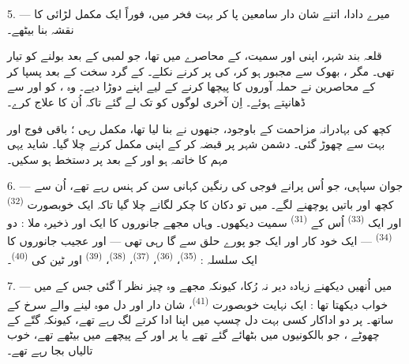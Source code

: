 5. --- میرے دادا، اتنے شان دار سامعین پا کر بہت فخر میں، فوراً ایک
مکمل لڑائی کا نقشہ بنا بیٹھے۔

قلعہ بند شہر، اپنی  اور  سمیت،
 کے محاصرے میں تھا، جو لمبی  کے
بعد  بولنے کو تیار تھی۔ مگر ، بھوک سے
مجبور ہو کر،  کی  پر
 کرنے نکلے۔  کے گرد سخت 
کے بعد  پسپا کر کے  محاصرین نے
 حملہ آوروں کا پیچھا کرنے کے لیے اپنے
 دوڑا دیے۔ وہ ، 
کو  اور  سے ڈھانپتے ہوئے۔
 اِن آخری لوگوں کو  تک لے گئے
تاکہ  اُن کا علاج کرے۔

کچھ  کی بہادرانہ مزاحمت کے باوجود، جنھوں نے
 بنا لیا تھا،  مکمل رہی ؛ باقی فوج
 اور بہت سے  چھوڑ گئی۔ دشمن شہر پر قبضہ
کر کے اپنی  مکمل کرنے چلا گیا۔ شاید یہی مہم کا خاتمہ ہو
اور  کے بعد  پر دستخط ہو سکیں۔

\VUsaut{4.4mm}
\VUsaut{2.8mm}

6. --- جوان سپاہی، جو اُس پرانے فوجی کی رنگین کہانی سن کر ہنس رہے
تھے، اُن سے کچھ اور باتیں پوچھنے لگے۔ میں تو دکان کا چکر لگانے چلا
گیا تاکہ ایک خوبصورت  \textsuperscript{(32)} اور
ایک  \textsuperscript{(33)} اُس کے 
\textsuperscript{(31)} سمیت دیکھوں۔ وہاں مجھے جانوروں کا ایک اور
ذخیرہ ملا : دو  \textsuperscript{(34)} — ایک
خود کار  اور ایک  جو پورے حلق سے گا رہی
تھی — اور عجیب جانوروں کا ایک سلسلہ : 
\textsuperscript{(35)}،  \textsuperscript{(36)}،
 \textsuperscript{(37)}، 
\textsuperscript{(38)}،  \textsuperscript{(39)} اور ٹین کی
 \textsuperscript{(40)}۔

7. --- میں اُنھیں دیکھنے زیادہ دیر نہ رُکا، کیونکہ مجھے وہ چیز نظر
آ گئی جس کے میں خواب دیکھتا تھا : ایک نہایت خوبصورت  \textsuperscript{(41)}، شان دار  اور دل موہ لینے
والے سرخ  کے ساتھ۔  پر دو اداکار کسی بہت
دل چسپ  میں اپنا  ادا کرتے لگ رہے تھے،
کیونکہ گتّے کے چھوٹے ، جو بالکونیوں میں بٹھائے گئے تھے
یا  پر اور  کے پیچھے
 میں بیٹھے تھے، خوب تالیاں بجا رہے تھے۔

